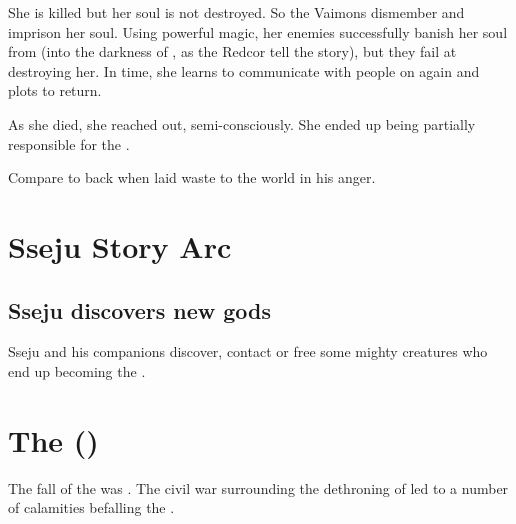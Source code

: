 She is killed but her soul is not destroyed. 
So the Vaimons dismember and imprison her soul. 
Using powerful magic, her enemies successfully banish her soul from \Miith{} (into the darkness of \nieur{}, as the Redcor tell the story), but they fail at destroying her. In time, she learns to communicate with people on \Miith{} again and plots to return. 

As she died, she reached out, semi-consciously. 
She ended up being partially responsible for the \HundredScourges. 


Compare to back when \Ishnaruchaefir{} laid waste to the world in his anger. 















\section{Sseju Story Arc}
\subsection{Sseju discovers new gods}
Sseju and his companions discover, contact or free some mighty creatures who end up becoming the . 















\section{The \HundredScourges ()}
The fall of the \VaimonCaliphate was . 
The civil war surrounding the dethroning of \Belzir{} led to a number of calamities befalling the \caliphate. 

